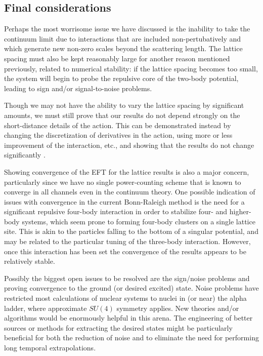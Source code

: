 \subsection{\label{conclusions}Final considerations}
Perhaps the most worrisome issue we have discussed is the inability to take the continuum limit due to interactions that are included non-pertubatively and which generate new non-zero scales beyond the scattering length. The lattice spacing must also be kept reasonably large for another reason mentioned previously, related to numerical stability: if the lattice spacing becomes too small, the system will begin to probe the repulsive core of the two-body potential, leading to sign and/or signal-to-noise problems. 

Though we may not have the ability to vary the lattice spacing by significant amounts, we must still prove that our results do not depend strongly on the short-distance details of the action. This can be demonstrated instead by changing the discretization of derivatives in the action, using more or less improvement of the interaction, etc., and showing that the results do not change significantly \cite{Lee:2008fa}. 

Showing convergence of the EFT for the lattice results is also a major concern, particularly since we have no single power-counting scheme that is known to converge in all channels even in the continuum theory. One possible indication of issues with convergence in the current Bonn-Raleigh method is the need for a significant repulsive four-body interaction in order to stabilize four- and higher-body systems, which seem prone to forming four-body clusters on a single lattice site. This is akin to the particles falling to the bottom of a singular potential, and may be related to the particular tuning of the three-body interaction. However, once this interaction has been set the convergence of the results appears to be relatively stable.

Possibly the biggest open issues to be resolved are the sign/noise problems and proving convergence to the ground (or desired excited) state. Noise problems have restricted most calculations of nuclear systems to nuclei in (or near) the alpha ladder, where approximate $SU(4)$ symmetry applies. New theories and/or algorithms would be enormously helpful in this arena. The engineering of better sources or methods for extracting the desired states might be particularly beneficial for both the reduction of noise and to eliminate the need for performing long temporal extrapolations.


